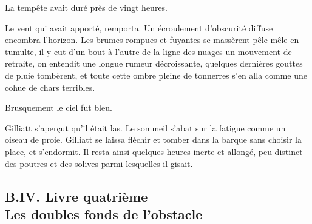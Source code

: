 \documentclass[french,twoside]{book} %
\begin{document}
La tempête avait duré près de vingt heures.\par
Le vent qui avait apporté, remporta. Un écroulement d’obscurité diffuse encombra l’horizon. Les brumes rompues et fuyantes se massèrent pêle-mêle en tumulte, il y eut d’un bout à l’autre de la ligne des nuages un mouvement de retraite, on entendit une longue rumeur décroissante, quelques dernières gouttes de pluie tombèrent, et toute cette ombre pleine de tonnerres s’en alla comme une cohue de chars terribles.\par
Brusquement le ciel fut bleu.\par
Gilliatt s’aperçut qu’il était las. Le sommeil s’abat  sur la fatigue comme un oiseau de proie. Gilliatt se laissa fléchir et tomber dans la barque sans choisir la place, et s’endormit. Il resta ainsi quelques heures inerte et allongé, peu distinct des poutres et des solives parmi lesquelles il gisait.
 \subsection[{B.IV. Livre quatrième. Les doubles fonds de l’obstacle}]{B.IV. Livre quatrième \\
Les doubles fonds de l’obstacle}
\end{document}
